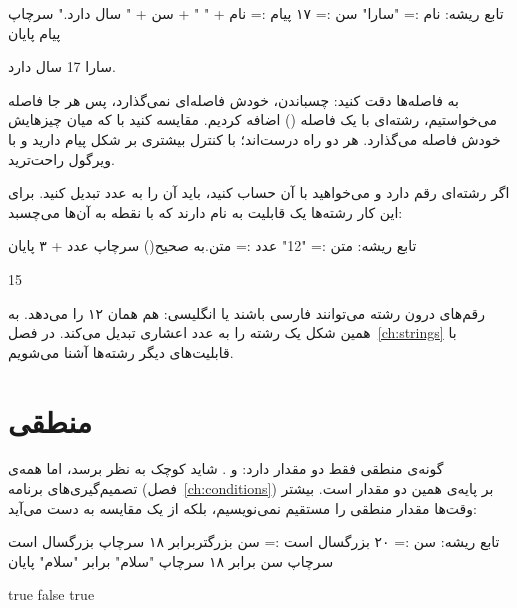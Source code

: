 \begin{salamfa}
تابع ریشه:
    نام := "سارا"
    سن := ۱۷
    پیام := نام + " " + سن + " سال دارد."
    سرچاپ پیام
پایان
\end{salamfa}

\begin{outputfa}
سارا 17 سال دارد.
\end{outputfa}

به فاصله‌ها دقت کنید: چسباندن، خودش فاصله‌ای نمی‌گذارد، پس هر جا فاصله
می‌خواستیم، رشته‌ای با یک فاصله () اضافه کردیم. مقایسه کنید با
 که میان چیزهایش خودش فاصله می‌گذارد. هر دو راه درست‌اند؛
با \code{+} کنترل بیشتری بر شکل پیام دارید و با ویرگول راحت‌ترید.

اگر رشته‌ای رقم دارد و می‌خواهید با آن حساب کنید، باید آن را به عدد تبدیل
کنید. برای این کار رشته‌ها یک قابلیت به نام  دارند که با
نقطه به آن‌ها می‌چسبد:

\begin{salamfa}
تابع ریشه:
    متن := "12"
    عدد := متن.به صحیح()
    سرچاپ عدد + ۳
پایان
\end{salamfa}

\begin{outputfa}
15
\end{outputfa}

رقم‌های درون رشته می‌توانند فارسی باشند یا انگلیسی:  هم
همان ۱۲ را می‌دهد. به همین شکل  یک رشته را به عدد اعشاری تبدیل می‌کند. در فصل~\ref{ch:strings} با قابلیت‌های دیگر رشته‌ها آشنا می‌شویم.

\section{منطقی}

گونه‌ی منطقی فقط دو مقدار دارد:  و . شاید کوچک به
نظر برسد، اما همه‌ی تصمیم‌گیری‌های برنامه (فصل~\ref{ch:conditions}) بر
پایه‌ی همین دو مقدار است. بیشتر وقت‌ها مقدار منطقی را مستقیم نمی‌نویسیم،
بلکه از یک مقایسه به دست می‌آید:

\begin{salamfa}
تابع ریشه:
    سن := ۲۰
    بزرگسال است := سن بزرگتربرابر ۱۸
    سرچاپ بزرگسال است
    سرچاپ سن برابر ۱۸
    سرچاپ "سلام" برابر "سلام"
پایان
\end{salamfa}

\begin{outputfa}
true
false
true
\end{outputfa}


